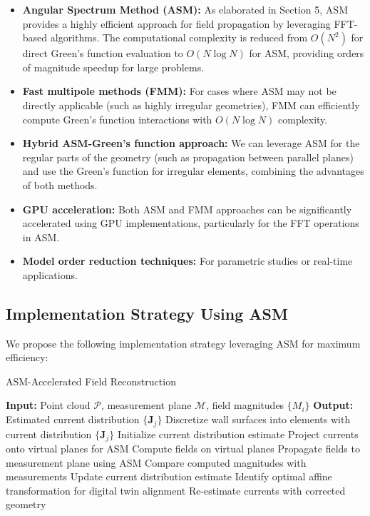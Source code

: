 \documentclass[12pt,a4paper]{article}
\begin{document}
\begin{itemize}
    \item \textbf{Angular Spectrum Method (ASM):} As elaborated in Section 5, ASM provides a highly efficient approach for field propagation by leveraging FFT-based algorithms. The computational complexity is reduced from $O(N^2)$ for direct Green's function evaluation to $O(N \log N)$ for ASM, providing orders of magnitude speedup for large problems.

    \item \textbf{Fast multipole methods (FMM):} For cases where ASM may not be directly applicable (such as highly irregular geometries), FMM can efficiently compute Green's function interactions with $O(N \log N)$ complexity.

    \item \textbf{Hybrid ASM-Green's function approach:} We can leverage ASM for the regular parts of the geometry (such as propagation between parallel planes) and use the Green's function for irregular elements, combining the advantages of both methods.

    \item \textbf{GPU acceleration:} Both ASM and FMM approaches can be significantly accelerated using GPU implementations, particularly for the FFT operations in ASM.

    \item \textbf{Model order reduction techniques:} For parametric studies or real-time applications.
\end{itemize}

\subsection{Implementation Strategy Using ASM}

We propose the following implementation strategy leveraging ASM for maximum efficiency:

\begin{algorithm}
\caption{ASM-Accelerated Field Reconstruction}
\begin{algorithmic}[1]
\State \textbf{Input:} Point cloud $\mathcal{P}$, measurement plane $\mathcal{M}$, field magnitudes $\{M_i\}$
\State \textbf{Output:} Estimated current distribution $\{\mathbf{J}_j\}$
\State Discretize wall surfaces into elements with current distribution $\{\mathbf{J}_j\}$
\State Initialize current distribution estimate
    \State Project currents onto virtual planes for ASM
    \State Compute fields on virtual planes
    \State Propagate fields to measurement plane using ASM
    \State Compare computed magnitudes with measurements
    \State Update current distribution estimate
\EndWhile
\State Identify optimal affine transformation for digital twin alignment
\State Re-estimate currents with corrected geometry
\end{algorithmic}
\end{algorithm}
\end{document}

